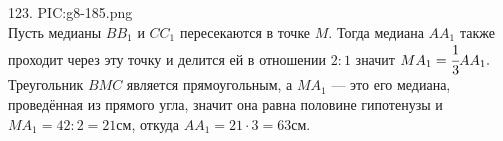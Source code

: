 123. {{PIC:g8-185.png}}\\
Пусть медианы $BB_1$ и $CC_1$ пересекаются в точке $M.$ Тогда медиана $AA_1$ также проходит через эту точку и делится ей в отношении $2:1$ значит $MA_1=\cfrac{1}{3}AA_1.$ Треугольник $BMC$ является прямоугольным, а $MA_1$ --- это его медиана, проведённая из прямого угла, значит она равна половине гипотенузы и $MA_1=42:2=21$см, откуда $AA_1=21\cdot3=63$см.\\
